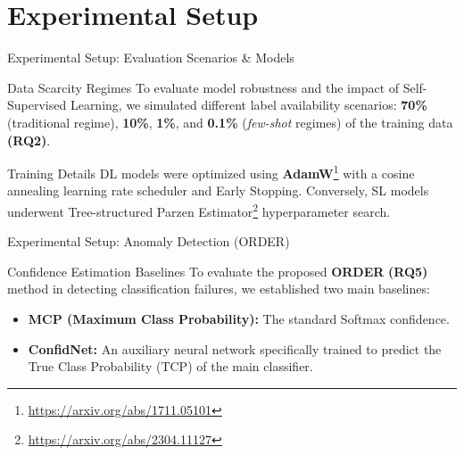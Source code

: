 \section{Experimental Setup}
\label{sec:06:setup}

\begin{frame}{Experimental Setup: Evaluation Scenarios \& Models}
    \begin{block}{Data Scarcity Regimes}
        To evaluate model robustness and the impact of Self-Supervised Learning, we simulated different label availability scenarios: \textbf{70\%} (traditional regime), \textbf{10\%}, \textbf{1\%}, and \textbf{0.1\%} (\textit{few-shot} regimes) of the training data \textbf{(RQ2)}.
    \end{block}

    \vspace{0.2cm}

    \begin{block}{Training Details}
        DL models were optimized using \textbf{AdamW}\footnote[1]{\url{https://arxiv.org/abs/1711.05101}} with a cosine annealing learning rate scheduler and Early Stopping. Conversely, SL models underwent Tree-structured Parzen Estimator\footnote[2]{\url{https://arxiv.org/abs/2304.11127}} hyperparameter search.
    \end{block}
\end{frame}

\begin{frame}{Experimental Setup: Anomaly Detection (ORDER)}
    \begin{block}{Confidence Estimation Baselines}
        To evaluate the proposed \textbf{ORDER} \textbf{(RQ5)} method in detecting classification failures, we established two main baselines:
        \begin{itemize}
            \item \textbf{MCP (Maximum Class Probability):} The standard Softmax confidence.
            \item \textbf{ConfidNet:} An auxiliary neural network specifically trained to predict the True Class Probability (TCP) of the main classifier.
        \end{itemize}
    \end{block}

\end{frame}
